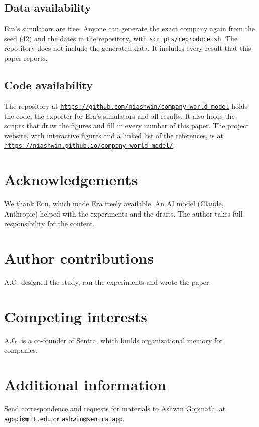 \documentclass[11pt]{article}
\begin{document}
\subsection{Data availability}
Era's simulators are free. Anyone can generate the exact company again from the seed (42) and the dates in the repository, with \texttt{scripts/reproduce.sh}. The repository does not include the generated data. It includes every result that this paper reports.

\subsection{Code availability}
\label{sec:code}
The repository at \href{https://github.com/niashwin/company-world-model}{\mbox{\nolinkurl{https://github.com/}}\nolinkurl{niashwin/company-world-model}} holds the code, the exporter for Era's simulators and all results. It also holds the scripts that draw the figures and fill in every number of this paper. The project website, with interactive figures and a linked list of the references, is at \href{https://niashwin.github.io/company-world-model/}{\mbox{\nolinkurl{https://niashwin.github.io/}}\nolinkurl{company-world-model/}}.

\section{Acknowledgements}
We thank Eon, which made Era freely available. An AI model (Claude, Anthropic) helped with the experiments and the drafts. The author takes full responsibility for the content.

\section{Author contributions}
A.G. designed the study, ran the experiments and wrote the paper.

\section{Competing interests}
A.G. is a co-founder of Sentra, which builds organizational memory for companies.

\section{Additional information}
{\raggedright Send correspondence and requests for materials to Ashwin Gopinath, at \href{mailto:agopi@mit.edu}{\mbox{\nolinkurl{agopi@mit.edu}}} or \href{mailto:ashwin@sentra.app}{\mbox{\nolinkurl{ashwin@sentra.app}}}.\par}
\end{document}
